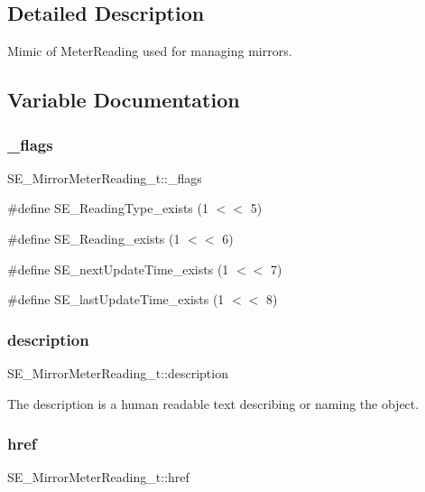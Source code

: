 \subsection{Detailed Description}
Mimic of Meter\+Reading used for managing mirrors. 

\subsection{Variable Documentation}
\mbox{\label{group__MirrorMeterReading_gabcc4d1dbd86cc1a59a5239a676c92dbd}} 
\subsubsection{\texorpdfstring{\+\_\+flags}{\_flags}}
{\footnotesize\ttfamily S\+E\+\_\+\+Mirror\+Meter\+Reading\+\_\+t\+::\+\_\+flags}

\#define S\+E\+\_\+\+Reading\+Type\+\_\+exists (1 $<$$<$ 5)

\#define S\+E\+\_\+\+Reading\+\_\+exists (1 $<$$<$ 6)

\#define S\+E\+\_\+next\+Update\+Time\+\_\+exists (1 $<$$<$ 7)

\#define S\+E\+\_\+last\+Update\+Time\+\_\+exists (1 $<$$<$ 8) \mbox{\label{group__MirrorMeterReading_ga959c2527270a7004344e91b2dbe90811}} 
\subsubsection{\texorpdfstring{description}{description}}
{\footnotesize\ttfamily S\+E\+\_\+\+Mirror\+Meter\+Reading\+\_\+t\+::description}

The description is a human readable text describing or naming the object. \mbox{\label{group__MirrorMeterReading_ga708f7129eb6e118a8d938112b6417c62}} 
\subsubsection{\texorpdfstring{href}{href}}
{\footnotesize\ttfamily S\+E\+\_\+\+Mirror\+Meter\+Reading\+\_\+t\+::href}

